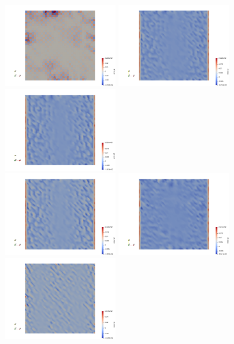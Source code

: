 \begin{center}
\includegraphics[width=5cm]{python_codes/fieldstone_12/results/rand/errp}
\includegraphics[width=5cm]{python_codes/fieldstone_12/results/rand/errq1}
\includegraphics[width=5cm]{python_codes/fieldstone_12/results/rand/errq2}\\
\includegraphics[width=5cm]{python_codes/fieldstone_12/results/rand/errq3}
\includegraphics[width=5cm]{python_codes/fieldstone_12/results/rand/errq4}
\includegraphics[width=5cm]{python_codes/fieldstone_12/results/rand/errq6}\\

\end{center}
